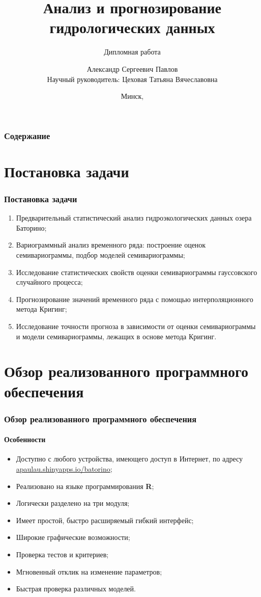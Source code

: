 \documentclass{beamer}
\title[Анализ и прогнозирование гидрологических данных]{Анализ и прогнозирование гидрологических данных}
\subtitle{Дипломная работа}
\author[Павлов А.С.]{Александр Сергеевич Павлов \\ \smallskip Научный руководитель: Цеховая Татьяна Вячеславовна}
\institute[БГУ, ФПМИ]{Факультет прикладной математики и информатики \\ \smallskip Кафедра теории вероятностей и математической статистики}
\date{Минск, \the\year}
\begin{document}

\frame[plain]{\titlepage}    %

\section[Содержание]{}
\begin{frame}
  \frametitle{Содержание}
  \tableofcontents
\end{frame}

\section{Постановка задачи}
\begin{frame}
  \frametitle{Постановка задачи}
  \begin{enumerate}
    \item Предварительный статистический анализ гидроэкологических данных озера Баторино;
    \item Вариограммный анализ временного ряда: построение оценок семивариограммы,  подбор моделей семивариограммы;
    \item Исследование статистических свойств оценки семивариограммы гауссовского случайного процесса;
    \item Прогнозирование значений временного ряда с помощью интерполяционного метода Кригинг;
    \item Исследование точности прогноза в зависимости от оценки семивариограммы и модели семивариограммы, лежащих в основе метода Кригинг.
  \end{enumerate}
\end{frame}

\section{Обзор реализованного программного обеспечения}
\begin{frame}
  \frametitle{Обзор реализованного программного обеспечения}
  \framesubtitle{Особенности}
  \begin{itemize}
    \item Доступно с любого устройства, имеющего доступ в Интернет, по адресу \href{https://apaulau.shinyapps.io/batorino}{apaulau.shinyapps.io/batorino};
    \item Реализовано на языке программирования \textbf{R};
    \item Логически разделено на три модуля;
    \item Имеет простой, быстро расширяемый гибкий интерфейс;
    \item Широкие графические возможности;
    \item Проверка тестов и критериев;
    \item Мгновенный отклик на изменение параметров;
    \item Быстрая проверка различных моделей.
  \end{itemize}
\end{frame}
\end{document}
